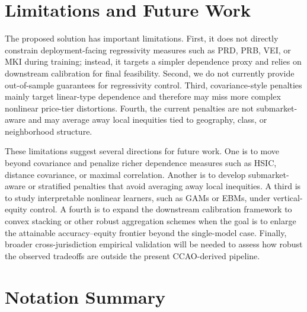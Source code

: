 \documentclass[12pt]{article}
\theoremstyle{plain}
\theoremstyle{definition}
\begin{document}
\section{Limitations and Future Work}
\label{sec:limitations}

The proposed solution has important limitations. First, it does not directly constrain deployment-facing regressivity measures such as PRD, PRB, VEI, or MKI during training; instead, it targets a simpler dependence proxy and relies on downstream calibration for final feasibility. Second, we do not currently provide out-of-sample guarantees for regressivity control. Third, covariance-style penalties mainly target linear-type dependence and therefore may miss more complex nonlinear price-tier distortions. Fourth, the current penalties are not submarket-aware and may average away local inequities tied to geography, class, or neighborhood structure.

These limitations suggest several directions for future work. One is to move beyond covariance and penalize richer dependence measures such as HSIC, distance covariance, or maximal correlation. Another is to develop submarket-aware or stratified penalties that avoid averaging away local inequities. A third is to study interpretable nonlinear learners, such as GAMs or EBMs, under vertical-equity control. A fourth is to expand the downstream calibration framework to convex stacking or other robust aggregation schemes when the goal is to enlarge the attainable accuracy--equity frontier beyond the single-model case. Finally, broader cross-jurisdiction empirical validation will be needed to assess how robust the observed tradeoffs are outside the present CCAO-derived pipeline.

\appendix

\section{Notation Summary}
\label{app:notation}
\end{document}
